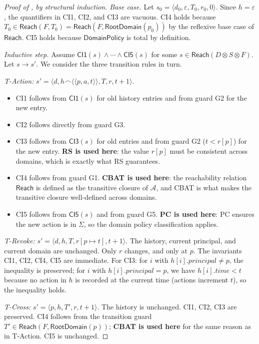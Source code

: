 \documentclass[11pt,a4paper]{article}
\theoremstyle{plain}
\theoremstyle{definition}
\theoremstyle{remark}
\begin{document}
\begin{proof}[Proof of , by structural induction]
\emph{Base case.} Let $s_0 = \langle d_0, \varepsilon, T_0, r_0, 0 \rangle$.
Since $h = \varepsilon$, the quantifiers in CI1, CI2, and CI3 are vacuous.
CI4 holds because $T_0 \in \mathsf{Reach}(F, T_0) =
\mathsf{Reach}(F, \mathsf{RootDomain}(p_0))$ by the reflexive base case of
$\mathsf{Reach}$. CI5 holds because $\mathsf{DomainPolicy}$ is total by
definition.

\emph{Inductive step.} Assume $\mathsf{CI1}(s) \wedge \cdots \wedge
\mathsf{CI5}(s)$ for some $s \in \mathsf{Reach}(D \otimes S \otimes F)$. Let
$s \to s'$. We consider the three transition rules in turn.

\emph{T-Action:} $s' = \langle d, h \frown \langle \langle p, a, t \rangle
\rangle, T, r, t + 1 \rangle$.
\begin{itemize}
\item CI1 follows from $\mathsf{CI1}(s)$ for old history entries and from
guard G2 for the new entry.
\item CI2 follows directly from guard G3.
\item CI3 follows from $\mathsf{CI3}(s)$ for old entries and from guard G2
($t < r[p]$) for the new entry. \textbf{RS is used here}: the value $r[p]$
must be consistent across domains, which is exactly what RS guarantees.
\item CI4 follows from guard G1. \textbf{CBAT is used here}: the reachability
relation $\mathsf{Reach}$ is defined as the transitive closure of
$\mathcal{A}$, and CBAT is what makes the transitive closure well-defined
across domains.
\item CI5 follows from $\mathsf{CI5}(s)$ and from guard G5. \textbf{PC is
used here}: PC ensures the new action is in $\Sigma$, so the domain policy
classification applies.
\end{itemize}

\emph{T-Revoke:} $s' = \langle d, h, T, r[p \mapsto t], t + 1 \rangle$. The
history, current principal, and current domain are unchanged. Only
$r$ changes, and only at $p$. The invariants CI1, CI2, CI4, CI5 are
immediate. For CI3: for $i$ with $h[i].\mathit{principal} \neq p$, the
inequality is preserved; for $i$ with $h[i].\mathit{principal} = p$, we have
$h[i].\mathit{time} < t$ because no action in $h$ is recorded at the current
time (actions increment $t$), so the inequality holds.

\emph{T-Cross:} $s' = \langle p, h, T', r, t + 1 \rangle$. The history is
unchanged. CI1, CI2, CI3 are preserved. CI4 follows from the transition
guard $T' \in \mathsf{Reach}(F, \mathsf{RootDomain}(p))$; \textbf{CBAT is
used here} for the same reason as in T-Action. CI5 is unchanged.
\end{proof}
\end{document}
